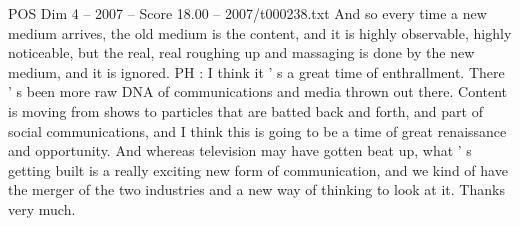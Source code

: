 \begin{textsample}{POS Dim 4 – 2007 – Score 18.00 – 2007/t000238.txt}
And so every time a new medium arrives, the old medium is the content, and it is highly observable, highly noticeable, but the real, real roughing up and massaging is done by the new medium, and it is ignored.
PH : I think it ' s a great time of enthrallment.
There ' s been more raw DNA of communications and media thrown out there.
Content is moving from shows to particles that are batted back and forth, and part of social communications, and I think this is going to be a time of great renaissance and opportunity.
And whereas television may have gotten beat up, what ' s getting built is a really exciting new form of communication, and we kind of have the merger of the two industries and a new way of thinking to look at it.
Thanks very much.

\end{textsample}

